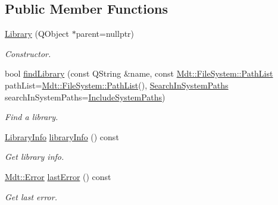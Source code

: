 \subsection*{Public Member Functions}
\begin{DoxyCompactItemize}
\item 
\hyperlink{class_mdt_1_1_deploy_utils_1_1_library_ae3d859ad862e026b00d12e50702ae4df}{Library} (Q\+Object $\ast$parent=nullptr)\hypertarget{class_mdt_1_1_deploy_utils_1_1_library_ae3d859ad862e026b00d12e50702ae4df}{}\label{class_mdt_1_1_deploy_utils_1_1_library_ae3d859ad862e026b00d12e50702ae4df}

\begin{DoxyCompactList}\small\item\em Constructor. \end{DoxyCompactList}\item 
bool \hyperlink{class_mdt_1_1_deploy_utils_1_1_library_ae15e39005f8445dbcc6790d377b9907d}{find\+Library} (const Q\+String \&name, const \hyperlink{class_mdt_1_1_file_system_1_1_path_list}{Mdt\+::\+File\+System\+::\+Path\+List} path\+List=\hyperlink{class_mdt_1_1_file_system_1_1_path_list}{Mdt\+::\+File\+System\+::\+Path\+List}(), \hyperlink{class_mdt_1_1_deploy_utils_1_1_library_ab9f58dba8290dd1882a21d73cc7c10d0}{Search\+In\+System\+Paths} search\+In\+System\+Paths=\hyperlink{class_mdt_1_1_deploy_utils_1_1_library_ab9f58dba8290dd1882a21d73cc7c10d0adabc8cd036aa884536c359cc3a2783ca}{Include\+System\+Paths})
\begin{DoxyCompactList}\small\item\em Find a library. \end{DoxyCompactList}\item 
\hyperlink{class_mdt_1_1_deploy_utils_1_1_library_info}{Library\+Info} \hyperlink{class_mdt_1_1_deploy_utils_1_1_library_a8b272e0c638aa2949b5f19b3c75ed9ae}{library\+Info} () const 
\begin{DoxyCompactList}\small\item\em Get library info. \end{DoxyCompactList}\item 
\hyperlink{class_mdt_1_1_error}{Mdt\+::\+Error} \hyperlink{class_mdt_1_1_deploy_utils_1_1_library_adb9bf35bba0d23731ac97d40fc5fe91d}{last\+Error} () const \hypertarget{class_mdt_1_1_deploy_utils_1_1_library_adb9bf35bba0d23731ac97d40fc5fe91d}{}\label{class_mdt_1_1_deploy_utils_1_1_library_adb9bf35bba0d23731ac97d40fc5fe91d}

\begin{DoxyCompactList}\small\item\em Get last error. \end{DoxyCompactList}\end{DoxyCompactItemize}


